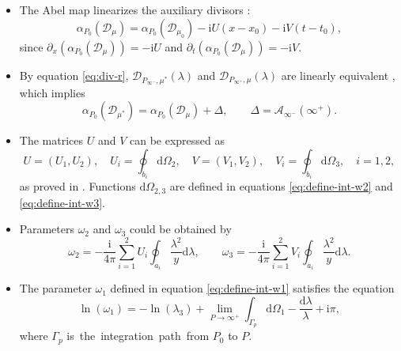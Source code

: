 \documentclass[11pt,reqno]{amsart}
\newcommand{\ii}{\mathrm{i}}
\newcommand{\dd}{\mathrm{d}}
\numberwithin{equation}{section}
\begin{document}
\begin{itemize}
	\item The Abel map linearizes the auxiliary divisors \cite{FritzH-2003-Algebro-Geometric}:
	\begin{equation}\label{eq:D-mu-define}
		\alpha_{P_0}(\mathcal{D}_{\mu})=\alpha_{P_0}(\mathcal{D}_{\mu_0})-\ii U(x-x_0)-\ii V(t-t_0),
	\end{equation} 
	since $\partial_x\left(\alpha_{P_0}(\mathcal{D}_{\mu})\right)=-\ii U$ and $\partial_t\left(\alpha_{P_0}(\mathcal{D}_{\mu})\right)=-\ii V$.
	\item By equation \eqref{eq:div-r}, $\mathcal{D}_{P_{\infty^-},\mu^*}(\lambda)$ and $\mathcal{D}_{P_{\infty^+},\mu}(\lambda)$ are linearly equivalent \cite{CaliniI-05-VFE,FritzH-2003-Algebro-Geometric}, which implies
	\begin{equation}\label{eq:relation-mu}
		\alpha_{P_0}(\mathcal{D}_{\mu^*}) = \alpha_{P_0}(\mathcal{D}_{\mu})+\Delta, \qquad \Delta=\mathcal{A}_{\infty^-}(\infty^{+}).
	\end{equation}
	\item The matrices $U$ and $V$ can be expressed as
	\begin{equation}\label{eq:U-V-define}
		U=\left(U_1,U_2\right),\quad U_i=\oint_{b_i}\dd \Omega_2, \quad 
		V=\left(V_1,V_2\right),\quad V_i=\oint_{b_i}\dd \Omega_3, \quad 
		i=1,2,
	\end{equation}
	as proved in \cite{BelokolosBEI-94,CaliniI-05-VFE,FritzH-2003-Algebro-Geometric}. Functions $\dd \Omega_{2,3}$ are defined in equations \eqref{eq:define-int-w2} and \eqref{eq:define-int-w3}.
	\item Parameters $\omega_2$ and $\omega_3$ \cite{CaliniI-05-VFE} could be obtained by 
	\begin{equation}\label{eq:omega-2-3-define}
		\omega_2 =-\frac{\ii}{4\pi} \sum_{i=1}^{2}U_i\oint_{a_i}\frac{\lambda^2}{y}\dd \lambda, \qquad
		\omega_3 =-\frac{\ii}{4\pi} \sum_{i=1}^{2}V_i\oint_{a_i}\frac{\lambda^2}{y}\dd \lambda.
	\end{equation}
	\item  The parameter $\omega_1$  \cite{CaliniI-05-VFE} defined in equation \eqref{eq:define-int-w1} satisfies the equation
	\begin{equation}\label{eq:omega-1-define}
		\ln(\omega_1 )=-\ln(\lambda_3)+\lim_{ P\rightarrow \infty^{+}}\int_{\Gamma_p}\dd\Omega_1-\frac{\dd \lambda}{\lambda}+\ii \pi,
	\end{equation}
	where $\Gamma_p$ is the integration path from $P_0$ to $P$.
\end{itemize}
\end{document}
